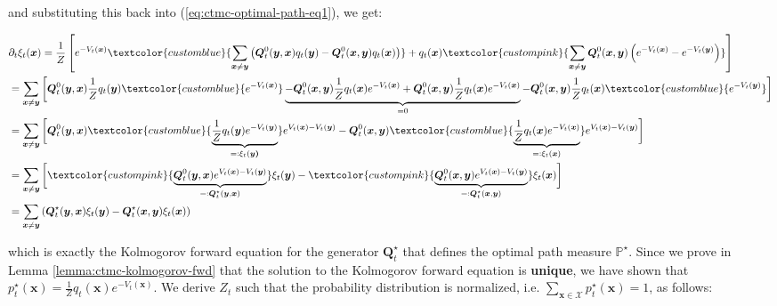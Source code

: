 \documentclass{article}
\newcommand{\bluetext}[1]{\textcolor{customblue}{#1}}
\newcommand{\pinktext}[1]{\textcolor{custompink}{#1}}
\begin{document}
and substituting this back into (\ref{eq:ctmc-optimal-path-eq1}), we get:
\begin{small}
\begin{align}
    &\partial_t\xi_t(\boldsymbol{x})=\frac{1}{Z}\left[e^{-V_t(\boldsymbol{x})}\bluetext{\sum_{\boldsymbol{x}\neq \boldsymbol{y}}\left(\boldsymbol{Q}^0_t(\boldsymbol{y}, \boldsymbol{x})q_t(\boldsymbol{y})-\boldsymbol{Q}_t^0(\boldsymbol{x}, \boldsymbol{y})q_t(\boldsymbol{x})\right)}+q_t(\boldsymbol{x})\pinktext{\sum_{\boldsymbol{x}\neq \boldsymbol{y}}\boldsymbol{Q}_t^0(\boldsymbol{x},\boldsymbol{y})\left(e^{-V_t(\boldsymbol{x})}-e^{-V_t(\boldsymbol{y})}\right)}\right]\nonumber\\
    &=\sum_{\boldsymbol{x}\neq\boldsymbol{y}}\bigg[\boldsymbol{Q}^0_t(\boldsymbol{y}, \boldsymbol{x})\frac{1}{Z}q_t(\boldsymbol{y})\bluetext{e^{-V_t(\boldsymbol{x})}}\underbrace{-\boldsymbol{Q}_t^0(\boldsymbol{x}, \boldsymbol{y})\frac{1}{Z}q_t(\boldsymbol{x})e^{-V_t(\boldsymbol{x})}+\boldsymbol{Q}_t^0(\boldsymbol{x}, \boldsymbol{y})\frac{1}{Z}q_t(\boldsymbol{x})e^{-V_t(\boldsymbol{x})}}_{=0}-\boldsymbol{Q}^0_t(\boldsymbol{x}, \boldsymbol{y})\frac{1}{Z}q_t(\boldsymbol{x})\bluetext{e^{-V_t(\boldsymbol{y})}}\bigg]\nonumber\\
    &=\sum_{\boldsymbol{x}\neq\boldsymbol{y}}\bigg[\boldsymbol{Q}^0_t(\boldsymbol{y}, \boldsymbol{x})\bluetext{\underbrace{\frac{1}{Z}q_t(\boldsymbol{y})e^{-V_t(\boldsymbol{y})}}_{=:\xi _t(\boldsymbol{y)}}}e^{V_t(\boldsymbol{x})-V_t(\boldsymbol{y})}-\boldsymbol{Q}^0_t(\boldsymbol{x}, \boldsymbol{y})\bluetext{\underbrace{\frac{1}{Z}q_t(\boldsymbol{x})e^{-V_t(\boldsymbol{x})}}_{=:\xi_t(\boldsymbol{x})}}e^{V_t(\boldsymbol{x})-V_t(\boldsymbol{y})}\bigg]\nonumber\\
    &=\sum_{\boldsymbol{x}\neq\boldsymbol{y}}\bigg[\pinktext{\underbrace{\boldsymbol{Q}^0_t(\boldsymbol{y}, \boldsymbol{x})e^{V_t(\boldsymbol{x})-V_t(\boldsymbol{y})}}_{=:\boldsymbol{Q}^\star_t(\boldsymbol{y}, \boldsymbol{x})}}\xi_t(\boldsymbol{y})-\pinktext{\underbrace{\boldsymbol{Q}^0_t(\boldsymbol{x}, \boldsymbol{y})e^{V_t(\boldsymbol{x})-V_t(\boldsymbol{y})}}_{=:\boldsymbol{Q}^\star_t(\boldsymbol{x}, \boldsymbol{y})}}\xi_t(\boldsymbol{x})\bigg]\nonumber\\
    &=\sum_{\boldsymbol{x}\neq\boldsymbol{y}}\left(\boldsymbol{Q}^\star_t(\boldsymbol{y}, \boldsymbol{x})\xi_t(\boldsymbol{y})-\boldsymbol{Q}^\star_t(\boldsymbol{x}, \boldsymbol{y})\xi_t(\boldsymbol{x})\right)
\end{align}
\end{small}
which is exactly the Kolmogorov forward equation for the generator $\boldsymbol{Q}^\star_t$ that defines the optimal path measure $\mathbb{P}^\star$. Since we prove in Lemma \ref{lemma:ctmc-kolmogorov-fwd} that the solution to the Kolmogorov forward equation is \textbf{unique}, we have shown that $p^\star_t(\boldsymbol{x})=\frac{1}{Z}q_t(\boldsymbol{x})e^{-V_t(\boldsymbol{x})}$. We derive $Z_t$ such that the probability distribution is normalized, i.e. $\sum_{\boldsymbol{x}\in \mathcal{X}}p^\star_t(\boldsymbol{x})=1$, as follows:
\end{document}
